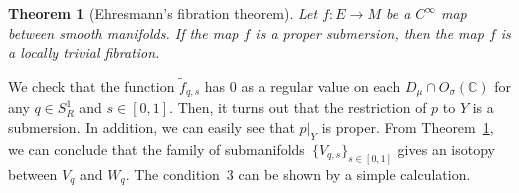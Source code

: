 \documentclass[10pt,a4paper]{amsart}
\numberwithin{equation}{section}
\newtheorem{Theorem}{Theorem}[section]
\begin{document}
\begin{Theorem}[Ehresmann's f\/ibration theorem]\label{th:ehr}
Let $f \colon E \to M$ be a $C^\infty$ map between smooth manifolds. If the map $f$ is a proper submersion, then the map $f$ is a locally trivial fibration.
\end{Theorem}

We check that the function $\tilde{f}_{q,s}$ has $0$ as a regular value on each $D_\mu \cap O_\sigma({\mathbb C})$ for any $q \in S_R^1$ and $s \in [0, 1]$.
Then, it turns out that the restriction of $p$ to $Y$ is a submersion. In addition, we can easily see that $p|_Y$ is proper.
From Theorem~\ref{th:ehr}, we can conclude that the family of submanifolds~$\{V_{q,s}\}_{s \in [0,1]}$ gives an isotopy between $V_q$ and $W_q$.
The condition~3 can be shown by a simple calculation.
\end{document}
